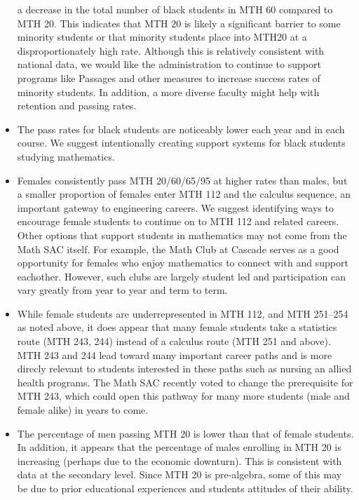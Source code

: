 \begin{itemize}
      a decrease in the total number of black students in MTH 60 compared to
      MTH 20. This indicates that MTH 20 is likely a significant barrier to
      some minority students or that minority students place into MTH20 at a
      disproportionately high rate. Although this is relatively consistent with
      national data, we would like the administration to continue to support
      programs like Passages and other measures to increase success rates of
      minority students. In addition, a more diverse faculty might help with
      retention and passing rates.
    \item The pass rates for black students are noticeably lower each year and
      in each course. We suggest intentionally creating support systems for
      black students studying mathematics.
    \item Females consistently pass MTH 20/60/65/95 at higher rates than males,
      but a smaller proportion of females enter MTH 112 and the calculus sequence, an important gateway to engineering careers. We suggest identifying ways to encourage female students to  continue on to MTH 112 and related careers. Other options that support students in mathematics may not come from the Math SAC itself. For example, the Math Club at Cascade serves as a good opportunity for females who enjoy mathematics to connect with and support eachother. However, such clubs are largely student led and participation can vary greatly from year to year and term to term. 
      
    \item While female students are underrepresented in MTH 112, and MTH 251--254 as
      noted above, it does appear that many female students take a
      statistics route (MTH 243, 244) instead of a calculus route (MTH 251 and above). MTH 243 and 244 lead toward many important career paths and is more direcly relevant to students interested in these paths such as nursing an allied health programs. The Math SAC recently voted to change the prerequisite for MTH 243, which could open this pathway for many more students (male and female alike) in years to come. 
    \item The percentage of men passing MTH 20 is lower than that of female
      students. In addition, it appears that the percentage of males enrolling
      in MTH 20 is increasing (perhaps due to the economic downturn). This is
      consistent with data at the secondary level. Since MTH 20 is pre-algebra,
      some of this may be due to prior educational experiences and students
      attitudes of their ability.
\end{itemize}

